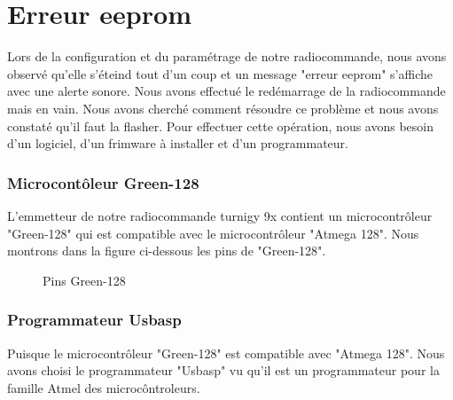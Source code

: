 	\section{Erreur eeprom}
	Lors de la configuration et du paramétrage de notre radiocommande, nous avons observé qu'elle s'éteind tout d'un coup et un message "erreur eeprom" s'affiche avec une alerte sonore. Nous avons effectué le redémarrage de la radiocommande mais en vain. Nous avons cherché comment résoudre ce problème et nous avons constaté qu'il faut la flasher. Pour effectuer cette opération, nous avons besoin d'un logiciel, d'un frimware à installer et d'un programmateur.
	\subsubsection{Microcontôleur Green-128}
	L'emmetteur de notre radiocommande turnigy 9x contient un microcontrôleur "Green-128" qui est compatible avec le microcontrôleur  "Atmega 128". Nous montrons dans la figure ci-dessous les pins de "Green-128". 
	\begin{figure}[h]
		\begin{center}
			\centering
		\end{center}
		\caption{Pins Green-128}
	\end{figure}
	\subsubsection{Programmateur Usbasp}
	Puisque le microcontrôleur "Green-128" est compatible avec "Atmega 128". Nous avons choisi le programmateur "Usbasp" vu qu'il est un programmateur pour la famille Atmel des microcôntroleurs. 
	
